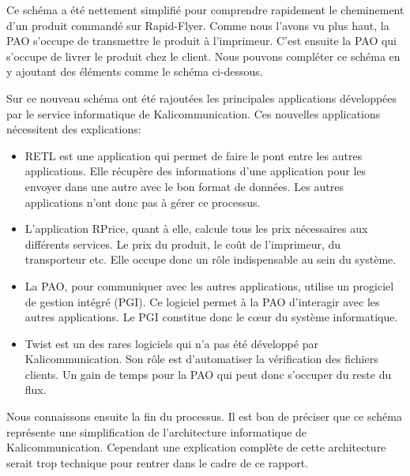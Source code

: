 

Ce schéma a été nettement simplifié pour comprendre rapidement le cheminement d'un produit commandé sur Rapid-Flyer. Comme nous l'avons vu plus haut, la PAO s'occupe de transmettre le produit à l'imprimeur. C'est ensuite la PAO qui s'occupe de livrer le produit chez le client. Nous pouvons compléter ce schéma en y ajoutant des éléments comme le schéma ci-dessous.



Sur ce nouveau schéma ont été rajoutées les principales applications développées par le service informatique de Kalicommunication. Ces nouvelles applications nécessitent des explications:
\begin{itemize}
\item RETL est une application qui permet de faire le pont entre les autres applications. Elle récupère des informations d'une application pour les envoyer dans une autre avec le bon format de données. Les autres applications n'ont donc pas à gérer ce processus.
\item L'application RPrice, quant à elle, calcule tous les prix nécessaires aux différents services. Le prix du produit, le coût de l'imprimeur, du transporteur etc. Elle occupe donc un rôle indispensable au sein du système.
\item La PAO, pour communiquer avec les autres applications, utilise un progiciel de gestion intégré (PGI). Ce logiciel permet à la PAO d'interagir avec les autres applications. Le PGI constitue donc le cœur du système informatique.
\item Twist est un des rares logiciels qui n'a pas été développé par Kalicommunication. Son rôle est d'automatiser la vérification des fichiers clients. Un gain de temps pour la PAO qui peut donc s'occuper du reste du flux.\newline
\end{itemize}
Nous connaissons ensuite la fin du processus. Il est bon de préciser que ce schéma représente une simplification de l'architecture informatique de Kalicommunication. Cependant une explication complète de cette architecture serait trop technique pour rentrer dans le cadre de ce rapport.